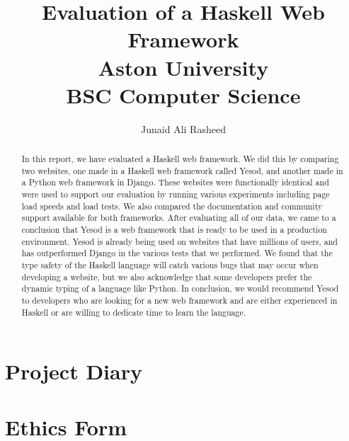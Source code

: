 \documentclass[a4paper,11pt,abstract=on,thesis,twoside]{report}
\title{
	{Evaluation of a Haskell Web Framework}\\
	{\large Aston University}\\
	{\large BSC Computer Science}
}
\author{Junaid Ali Rasheed}
\begin{document}


\maketitle



\tableofcontents
\listoffigures
\lstlistoflistings

\begin{abstract}
	In this report, we have evaluated a Haskell web framework. We did this by comparing
	two websites, one made in a Haskell web framework called Yesod, and another made
	in a Python web framework in Django. These websites were functionally identical
	and were used to support our evaluation by running various experiments including
	page load speeds and load tests. We also compared the documentation and community
	support available for both frameworks. After evaluating all of our data, we came
	to a conclusion that Yesod is a web framework that is ready to be used in a production
	environment. Yesod is already being used on websites that have millions of users,
	and has outperformed Django in the various tests that we performed. We found that the
	type safety of the Haskell language will catch various bugs that may occur when
	developing a website, but we also acknowledge that some developers prefer the dynamic
	typing of a language like Python. In conclusion, we would recommend Yesod to
	developers who are looking for a new web framework and are either experienced
	in Haskell or are willing to dedicate time to learn the language.
\end{abstract}

\cleardoublepage

\pagestyle{fancy}








\printbibliography[heading=bibintoc,title={References}]

\begin{refsection}

\nocite{*}
\printbibliography[heading=bibintoc,title={Bibliography}]  

\end{refsection}

\begin{appendices}



	
\chapter{Project Diary}


\chapter{Ethics Form}


\end{appendices}
\end{document}
